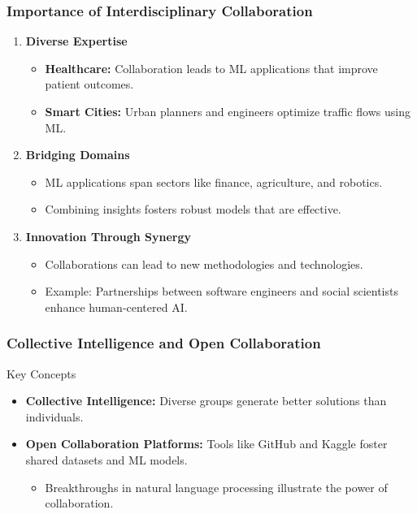 \documentclass[aspectratio=169]{beamer}
\begin{document}
\begin{frame}[fragile]
    \frametitle{Importance of Interdisciplinary Collaboration}
    \begin{enumerate}
        \item \textbf{Diverse Expertise}
            \begin{itemize}
                \item \textbf{Healthcare:} 
                    Collaboration leads to ML applications that improve patient outcomes.
                \item \textbf{Smart Cities:} 
                    Urban planners and engineers optimize traffic flows using ML.
            \end{itemize}
        
        \item \textbf{Bridging Domains}
            \begin{itemize}
                \item ML applications span sectors like finance, agriculture, and robotics.
                \item Combining insights fosters robust models that are effective.
            \end{itemize}
        
        \item \textbf{Innovation Through Synergy}
            \begin{itemize}
                \item Collaborations can lead to new methodologies and technologies.
                \item Example: Partnerships between software engineers and social scientists enhance human-centered AI.
            \end{itemize}
    \end{enumerate}
\end{frame}

\begin{frame}[fragile]
    \frametitle{Collective Intelligence and Open Collaboration}
    \begin{block}{Key Concepts}
        \begin{itemize}
            \item \textbf{Collective Intelligence:} Diverse groups generate better solutions than individuals.
            \item \textbf{Open Collaboration Platforms:} Tools like GitHub and Kaggle foster shared datasets and ML models.
                \begin{itemize}
                    \item Breakthroughs in natural language processing illustrate the power of collaboration.
                \end{itemize}
        \end{itemize}
    \end{block}
\end{frame}
\end{document}

